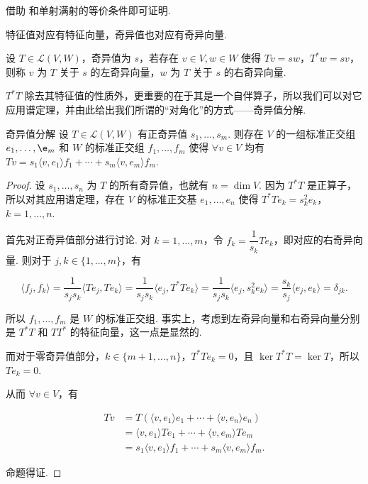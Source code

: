 借助 和单射满射的等价条件即可证明.

特征值对应有特征向量，奇异值也对应有奇异向量.

\begin{definition}{}{}
    设 $ T \in \mathcal{L}(V, W) $，奇异值为 $ s $，若存在 $ v \in V, w \in W $ 使得 $ Tv = sw $，$ T^*w = sv $，则称 $ v $ 为 $ T $ 关于 $ s $ 的左奇异向量，$ w $ 为 $ T $ 关于 $ s $ 的右奇异向量.
\end{definition}

$ T^*T $ 除去其特征值的性质外，更重要的在于其是一个自伴算子，所以我们可以对它应用谱定理，并由此给出我们所谓的“对角化”的方式——奇异值分解.

\begin{theorem}{奇异值分解}{} 
    设 $ T \in \mathcal{L}(V, W) $ 有正奇异值 $ s_1, \ldots , s_m $. 则存在 $ V $ 的一组标准正交组 $ e_1, \ldots, \e_m $ 和 $ W $ 的标准正交组 $ f_1, \ldots, f_m $ 使得 $ \forall v \in V $ 均有$ Tv = s_1 \langle v, e_1 \rangle f_1 + \cdots + s_m \langle v, e_m \rangle f_m $.
\end{theorem}

\begin{proof}
    设 $ s_1, \ldots, s_n $ 为 $ T $ 的所有奇异值，也就有 $ n = \dim V $. 因为 $ T^*T $ 是正算子，所以对其应用谱定理，存在 $ V $ 的标准正交基 $ e_1, \ldots, e_n $ 使得 $ T^*Te_k = s_k^2e_k $，$ k = 1, \ldots, n $.

    首先对正奇异值部分进行讨论. 对 $ k = 1, \ldots, m $，令 $ f_k = \dfrac{1}{s_k}Te_k $，即对应的右奇异向量. 则对于 $j, k \in \{1, \ldots, m\}$，有

    \[
        \langle f_j, f_k \rangle = \dfrac{1}{s_j s_k} \langle Te_j, Te_k \rangle = \dfrac{1}{s_j s_k} \langle e_j, T^*Te_k \rangle = \dfrac{1}{s_j s_k} \langle e_j, s_k^2e_k \rangle = \dfrac{s_k}{s_j} \langle e_j, e_k \rangle = \delta_{jk}.
    \]

    所以 $ f_1, \ldots, f_m $ 是 $ W $ 的标准正交组. 事实上，考虑到左奇异向量和右奇异向量分别是 $ T^*T $ 和 $ TT^* $ 的特征向量，这一点是显然的.

    而对于零奇异值部分，$k \in \{m+1, \ldots, n\}$，$ T^*Te_k = 0 $，且 $ \ker T^*T = \ker T $，所以 $ Te_k = 0 $.

    从而 $ \forall v \in V $，有

    \begin{align*}
        Tv & = T(\langle v, e_1 \rangle e_1 + \cdots + \langle v, e_n \rangle e_n)       \\
           & = \langle v, e_1 \rangle Te_1 + \cdots + \langle v, e_m \rangle Te_m        \\
           & = s_1 \langle v, e_1 \rangle f_1 + \cdots + s_m \langle v, e_m \rangle f_m.
    \end{align*}

    命题得证.
\end{proof}

